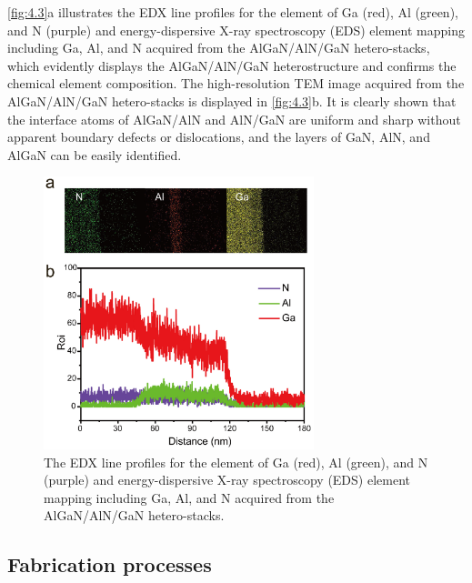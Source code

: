 \autoref{fig:4.3}a illustrates  the EDX  line profiles for the element of Ga (red), Al (green), and N (purple) and energy-dispersive X-ray spectroscopy (EDS) element mapping including Ga, Al, and N acquired from the AlGaN/AlN/GaN hetero-stacks, which evidently displays the AlGaN/AlN/GaN heterostructure and confirms the chemical element composition. The high-resolution TEM  image acquired from the AlGaN/AlN/GaN hetero-stacks is displayed in \autoref{fig:4.3}b. It is clearly shown that the interface atoms of AlGaN/AlN and AlN/GaN are uniform and sharp without apparent boundary defects or dislocations, and the layers of GaN, AlN, and AlGaN can be easily identified.

\begin{figure}[H] 
\centering    
\includegraphics[width=0.7\textwidth]{ch4_3}
\caption[The EDX line profiles for the element of Ga (red), Al (green), and N (purple) and energy-dispersive X-ray spectroscopy (EDS) element mapping including Ga, Al, and N acquired from the AlGaN/AlN/GaN hetero-stacks]{The EDX line profiles for the element of Ga (red), Al (green), and N (purple) and energy-dispersive X-ray spectroscopy (EDS) element mapping including Ga, Al, and N acquired from the AlGaN/AlN/GaN hetero-stacks.}
\label{fig:4.3}
\end{figure}

\subsection{Fabrication processes}
\label{sec:Fabrication processes}

